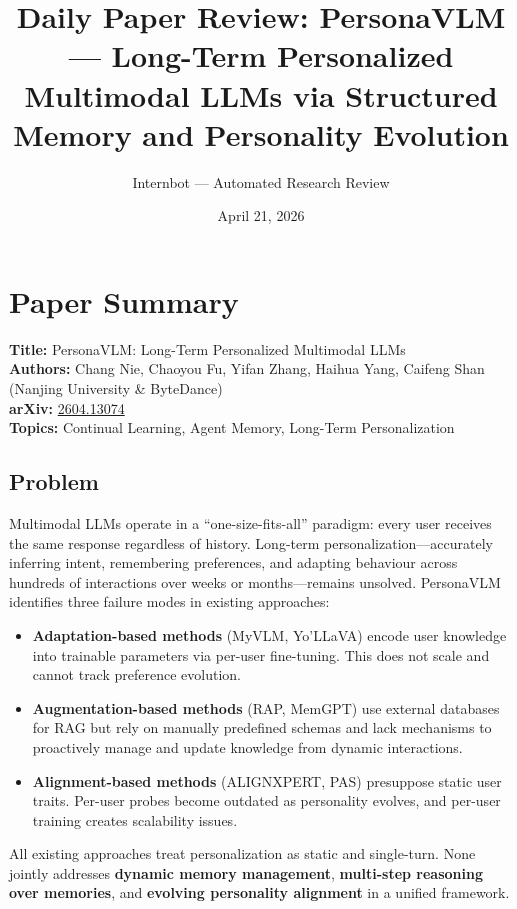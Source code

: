 \documentclass[11pt]{article}
\title{Daily Paper Review: PersonaVLM --- Long-Term Personalized\\Multimodal LLMs via Structured Memory and Personality Evolution}
\author{Internbot --- Automated Research Review}
\date{April 21, 2026}
\begin{document}
\maketitle

\section{Paper Summary}

\textbf{Title:} PersonaVLM: Long-Term Personalized Multimodal LLMs \\
\textbf{Authors:} Chang Nie, Chaoyou Fu, Yifan Zhang, Haihua Yang, Caifeng Shan (Nanjing University \& ByteDance) \\
\textbf{arXiv:} \href{https://arxiv.org/abs/2604.13074}{2604.13074} \\
\textbf{Topics:} Continual Learning, Agent Memory, Long-Term Personalization

\subsection{Problem}

Multimodal LLMs operate in a ``one-size-fits-all'' paradigm: every user receives the same response regardless of history. Long-term personalization---accurately inferring intent, remembering preferences, and adapting behaviour across hundreds of interactions over weeks or months---remains unsolved. PersonaVLM identifies three failure modes in existing approaches:

\begin{itemize}
    \item \textbf{Adaptation-based methods} (MyVLM, Yo'LLaVA) encode user knowledge into trainable parameters via per-user fine-tuning. This does not scale and cannot track preference evolution.

    \item \textbf{Augmentation-based methods} (RAP, MemGPT) use external databases for RAG but rely on manually predefined schemas and lack mechanisms to proactively manage and update knowledge from dynamic interactions.

    \item \textbf{Alignment-based methods} (ALIGNXPERT, PAS) presuppose static user traits. Per-user probes become outdated as personality evolves, and per-user training creates scalability issues.
\end{itemize}

All existing approaches treat personalization as static and single-turn. None jointly addresses \textbf{dynamic memory management}, \textbf{multi-step reasoning over memories}, and \textbf{evolving personality alignment} in a unified framework.
\end{document}
